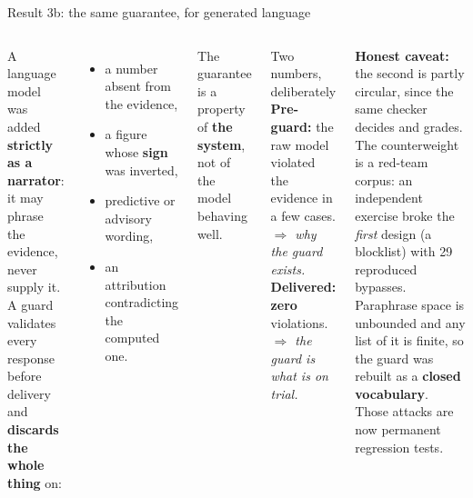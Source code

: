 \documentclass[aspectratio=169]{beamer}
\begin{document}
\begin{frame}{Result 3b: the same guarantee, for generated language}
\begin{columns}
\small
A language model was added \textbf{strictly as a narrator}: it may phrase the evidence, never
supply it. A guard validates every response before delivery and \textbf{discards the whole thing} on:
\begin{itemize}\small
  \item a number absent from the evidence,
  \item a figure whose \textbf{sign} was inverted,
  \item predictive or advisory wording,
  \item an attribution contradicting the computed one.
\end{itemize}
The guarantee is a property of \textbf{the system}, not of the model behaving well.
\begin{block}{Two numbers, deliberately}
\small
\textbf{Pre-guard:} the raw model violated the evidence in a few cases.\\
\emph{$\Rightarrow$ why the guard exists.}\\[4pt]
\textbf{Delivered:} \textbf{zero} violations.\\
\emph{$\Rightarrow$ the guard is what is on trial.}
\end{block}
{\footnotesize\textbf{Honest caveat:} the second is partly circular, since the same checker
decides and grades. The counterweight is a red-team corpus: an independent exercise broke the
\emph{first} design (a blocklist) with 29 reproduced bypasses. Paraphrase space is unbounded and
any list of it is finite, so the guard was rebuilt as a \textbf{closed vocabulary}. Those attacks
are now permanent regression tests.}
\end{columns}
\end{frame}
\end{document}
